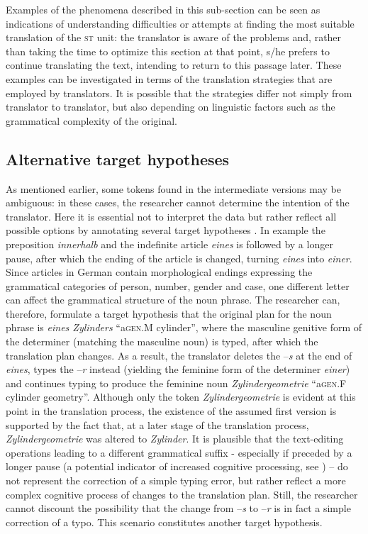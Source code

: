 \documentclass[output=paper]{LSP/langsci}
\begin{document}
Examples of the phenomena described in this sub-section can be seen as indications of understanding difficulties or attempts at finding the most suitable translation of the \textsc{st} unit: the translator is aware of the problems and, rather than taking the time to optimize this section at that point, s/he prefers to continue translating the text, intending to return to this passage later. These examples can be investigated in terms of the translation strategies that are employed by translators. It is possible that the strategies differ not simply from translator to translator, but also depending on linguistic factors such as the grammatical complexity of the original.

\subsection{Alternative target hypotheses} \label{sec:1:3:2}
As mentioned earlier, some tokens found in the intermediate versions may be ambiguous: in these cases, the researcher cannot determine the intention of the translator. Here it is essential not to interpret the data but rather reflect all possible options by annotating several target hypotheses \citep{Lüdeling2008}. In example  the preposition \textit{innerhalb} and the indefinite article \textit{eines} is followed by a longer pause, after which the ending of the article is changed, turning \textit{eines} into \textit{einer}. Since articles in German contain morphological endings expressing the grammatical categories of person, number, gender and case, one different letter can affect the grammatical structure of the noun phrase. The researcher can, therefore, formulate a target hypothesis that the original plan for the noun phrase is \textit{eines Zylinders} “a{\tiny \textsc{gen}.M} cylinder”, where the masculine genitive form of the determiner (matching the masculine noun) is typed, after which the translation plan changes. As a result, the translator deletes the –\textit{s} at the end of \textit{eines}, types the –\textit{r} instead (yielding the feminine form of the determiner \textit{einer}) and continues typing to produce the feminine noun \textit{Zylindergeometrie} “a{\tiny \textsc{gen}.F} cylinder geometry”. Although only the token \textit{Zylindergeometrie} is evident at this point in the translation process, the existence of the assumed first version is supported by the fact that, at a later stage of the translation process, \textit{Zylindergeometrie} was altered to \textit{Zylinder}. It is plausible that the text-editing operations leading to a different grammatical suffix - especially if preceded by a longer pause (a potential indicator of increased cognitive processing, see \citealt{Dragsted2005}) – do not represent the correction of a simple typing error, but rather reflect a more complex cognitive process of changes to the translation plan. Still, the researcher cannot discount the possibility that the change from –\textit{s} to –\textit{r} is in fact a simple correction of a typo. This scenario constitutes another target hypothesis.
\end{document}
